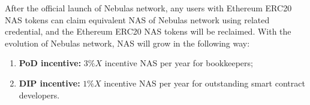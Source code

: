 After the official launch of Nebulas network, any users with Ethereum ERC20 NAS tokens can claim equivalent NAS of Nebulas network using related credential, and the Ethereum ERC20 NAS tokens will be reclaimed. With the evolution of Nebulas network, NAS will grow in the following way:

\begin{enumerate}
	\item \textbf{PoD incentive:} $3\%X$ incentive NAS per year for bookkeepers;
	
	\item \textbf{DIP incentive:} $1\%X$ incentive NAS per year for outstanding smart contract developers.
\end{enumerate}
